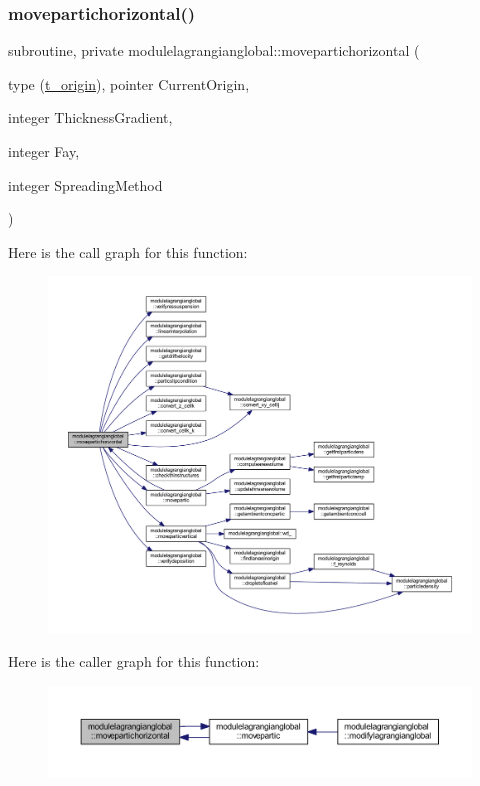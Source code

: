 \subsubsection{\texorpdfstring{movepartichorizontal()}{movepartichorizontal()}}
{\footnotesize\ttfamily subroutine, private modulelagrangianglobal\+::movepartichorizontal (\begin{DoxyParamCaption}\item[{type (\mbox{\hyperlink{structmodulelagrangianglobal_1_1t__origin}{t\+\_\+origin}}), pointer}]{Current\+Origin,  }\item[{integer}]{Thickness\+Gradient,  }\item[{integer}]{Fay,  }\item[{integer}]{Spreading\+Method }\end{DoxyParamCaption})\hspace{0.3cm}{\ttfamily [private]}}

Here is the call graph for this function\+:\nopagebreak
\begin{figure}[H]
\begin{center}
\leavevmode
\includegraphics[width=350pt]{namespacemodulelagrangianglobal_ab81fef0d1f9d7e83be8f27e7313bf968_cgraph}
\end{center}
\end{figure}
Here is the caller graph for this function\+:\nopagebreak
\begin{figure}[H]
\begin{center}
\leavevmode
\includegraphics[width=350pt]{namespacemodulelagrangianglobal_ab81fef0d1f9d7e83be8f27e7313bf968_icgraph}
\end{center}
\end{figure}
\mbox{\label{namespacemodulelagrangianglobal_abff124f5f5744390bce7f4e2ca7b33a4}} 
